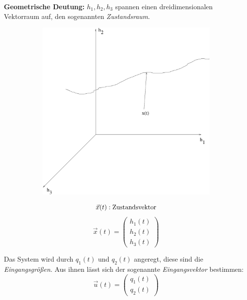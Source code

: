 \documentclass[12pt,a4paper,ngerman]{scrartcl}
\begin{document}
\textbf{Geometrische Deutung:} $h_1,h_2,h_3$ spannen einen dreidimensionalen Vektorraum auf, den sogenannten \emph{Zustandsraum}.\\
\begin{figure}[H]
  \begin{minipage}{0.5\linewidth}
    \begin{figure}[H]
      \includegraphics[width=0.9\linewidth]{sysregel_zustandsraum}
    \end{figure}
  \end{minipage}
  \begin{minipage}{0.5\linewidth}
    \[\vec{x}(t): \text{Zustandsvektor}\\\]
    \[\vec{x}(t)=  \begin{pmatrix}
            h_1(t) \\
            h_2(t) \\
            h_3(t) \end{pmatrix} \] 
  \end{minipage}
\end{figure}
Das System wird durch $q_1(t)$ und $q_2(t)$ angeregt, diese sind die \emph{Eingangsgrößen}. Aus ihnen lässt sich der sogenannte \emph{Eingangsvektor} bestimmen:
\begin{equation*}
  \vec{u}(t)=\begin{pmatrix}
                            q_1(t)\\
                            q_2(t)
             \end{pmatrix}
\end{equation*}
\end{document}
